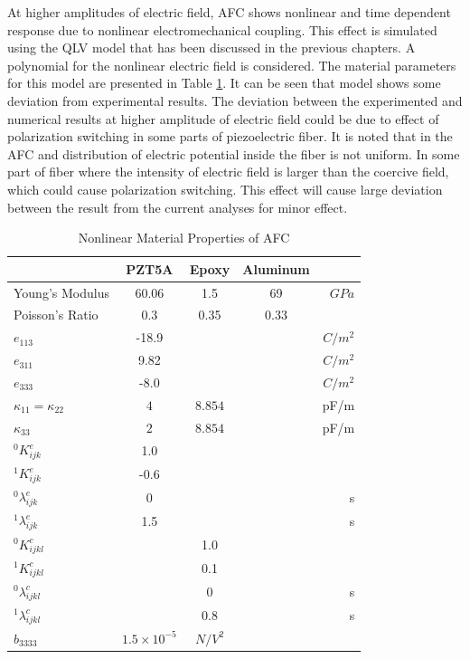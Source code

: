 At higher amplitudes of electric field, AFC shows nonlinear and time dependent response due to nonlinear electromechanical coupling. 
This effect is simulated using the QLV model that has been discussed in the previous chapters. 
A polynomial for the nonlinear electric field is considered. 
The material parameters for this model are presented in Table \ref{table:non_linear_materila_properties_afc}.
It can be seen that model shows some deviation from experimental results.
The deviation between the experimented and numerical results at higher amplitude of electric field could be due to effect of polarization switching in some parts of piezoelectric fiber.
It is noted that in the AFC and distribution of electric potential inside the fiber is not uniform.
In some part of fiber where the intensity of electric field is larger than the coercive field, which could cause polarization switching.
This effect will cause large deviation between the result from the current analyses for minor effect.


\begin{table}
\caption{Nonlinear Material Properties of AFC}
\centering
\begin{tabular}{|l|c|c|c|r|}
\hline
               & PZT5A & Epoxy & Aluminum & \\ \hline 
Young's Modulus&60.06 & 1.5     & 69       &$GPa$    \\ \hline
Poisson's Ratio&$0.3$ & 0.35    & 0.33 &\\ \hline 
$e_{113}$      &-18.9 &         &      &$C/m^2$\\ \hline
$e_{311}$      &9.82&         &      &$C/m^2$\\ \hline
$e_{333}$      &-8.0  &         &      &$C/m^2$\\ \hline
$\kappa_{11}=\kappa_{22}$ &  $ 4  $ & $8.854  $ & &  pF/m \\ \hline
$\kappa_{33}$ & $2  $              & $8.854  $ & &  pF/m \\ \hline
${}^{0}K_{ijk}^{e}$&1.0& & &  \\ \hline
${}^{1}K_{ijk}^{e}$&-0.6& & & \\ \hline
${}^{0}\lambda_{ijk}^{e}$&0& & & s \\ \hline
${}^{1}\lambda_{ijk}^{e}$&1.5& & & s \\ \hline 
${}^{0}K_{ijkl}^{c}$& &1.0 & &  \\ \hline
${}^{1}K_{ijkl}^{c}$& &0.1 & & \\ \hline
${}^{0}\lambda_{ijkl}^{c}$& &0&  & s\\ \hline
${}^{1}\lambda_{ijkl}^{c}$& &0.8 & & s \\ \hline 
$\widehat{b}_{3333}$ & $1.5 \times 10^{-5}$ &  $ N/V^2 $\\ \hline
\end{tabular}
\label{table:non_linear_materila_properties_afc} 
\end{table} 
 
